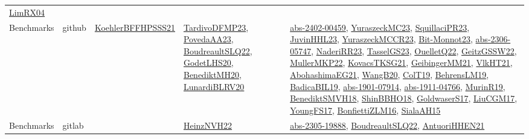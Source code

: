 {\begin{longtable}{lp{3cm}>{\raggedright}p{6cm}>{\raggedright}p{6cm}p{8cm}}
\href{papers/LimRX04.pdf}{LimRX04}\cite{LimRX04}\\
Benchmarks & github & \href{articles/KoehlerBFFHPSSS21.pdf}{KoehlerBFFHPSSS21}\cite{KoehlerBFFHPSSS21} & \href{papers/TardivoDFMP23.pdf}{TardivoDFMP23}\cite{TardivoDFMP23}, \href{papers/PovedaAA23.pdf}{PovedaAA23}\cite{PovedaAA23}, \href{papers/BoudreaultSLQ22.pdf}{BoudreaultSLQ22}\cite{BoudreaultSLQ22}, \href{papers/GodetLHS20.pdf}{GodetLHS20}\cite{GodetLHS20}, \href{articles/BenediktMH20.pdf}{BenediktMH20}\cite{BenediktMH20}, \href{articles/LunardiBLRV20.pdf}{LunardiBLRV20}\cite{LunardiBLRV20} & \href{articles/abs-2402-00459.pdf}{abs-2402-00459}\cite{abs-2402-00459}, \href{papers/YuraszeckMC23.pdf}{YuraszeckMC23}\cite{YuraszeckMC23}, \href{papers/SquillaciPR23.pdf}{SquillaciPR23}\cite{SquillaciPR23}, \href{papers/JuvinHHL23.pdf}{JuvinHHL23}\cite{JuvinHHL23}, \href{articles/YuraszeckMCCR23.pdf}{YuraszeckMCCR23}\cite{YuraszeckMCCR23}, \href{papers/Bit-Monnot23.pdf}{Bit-Monnot23}\cite{Bit-Monnot23}, \href{articles/abs-2306-05747.pdf}{abs-2306-05747}\cite{abs-2306-05747}, \href{articles/NaderiRR23.pdf}{NaderiRR23}\cite{NaderiRR23}, \href{papers/TasselGS23.pdf}{TasselGS23}\cite{TasselGS23}, \href{papers/OuelletQ22.pdf}{OuelletQ22}\cite{OuelletQ22}, \href{papers/GeitzGSSW22.pdf}{GeitzGSSW22}\cite{GeitzGSSW22}, \href{articles/MullerMKP22.pdf}{MullerMKP22}\cite{MullerMKP22}, \href{papers/KovacsTKSG21.pdf}{KovacsTKSG21}\cite{KovacsTKSG21}, \href{papers/GeibingerMM21.pdf}{GeibingerMM21}\cite{GeibingerMM21}, \href{articles/VlkHT21.pdf}{VlkHT21}\cite{VlkHT21}, \href{articles/AbohashimaEG21.pdf}{AbohashimaEG21}\cite{AbohashimaEG21}, \href{papers/WangB20.pdf}{WangB20}\cite{WangB20}, \href{papers/ColT19.pdf}{ColT19}\cite{ColT19}, \href{papers/BehrensLM19.pdf}{BehrensLM19}\cite{BehrensLM19}, \href{papers/BadicaBIL19.pdf}{BadicaBIL19}\cite{BadicaBIL19}, \href{articles/abs-1901-07914.pdf}{abs-1901-07914}\cite{abs-1901-07914}, \href{articles/abs-1911-04766.pdf}{abs-1911-04766}\cite{abs-1911-04766}, \href{papers/MurinR19.pdf}{MurinR19}\cite{MurinR19}, \href{papers/BenediktSMVH18.pdf}{BenediktSMVH18}\cite{BenediktSMVH18}, \href{articles/ShinBBHO18.pdf}{ShinBBHO18}\cite{ShinBBHO18}, \href{papers/GoldwaserS17.pdf}{GoldwaserS17}\cite{GoldwaserS17}, \href{papers/LiuCGM17.pdf}{LiuCGM17}\cite{LiuCGM17}, \href{papers/YoungFS17.pdf}{YoungFS17}\cite{YoungFS17}, \href{papers/BonfiettiZLM16.pdf}{BonfiettiZLM16}\cite{BonfiettiZLM16}, \href{papers/SialaAH15.pdf}{SialaAH15}\cite{SialaAH15}\\
Benchmarks & gitlab &  & \href{articles/HeinzNVH22.pdf}{HeinzNVH22}\cite{HeinzNVH22} & \href{articles/abs-2305-19888.pdf}{abs-2305-19888}\cite{abs-2305-19888}, \href{papers/BoudreaultSLQ22.pdf}{BoudreaultSLQ22}\cite{BoudreaultSLQ22}, \href{papers/AntuoriHHEN21.pdf}{AntuoriHHEN21}\cite{AntuoriHHEN21}\\

\end{longtable}}
